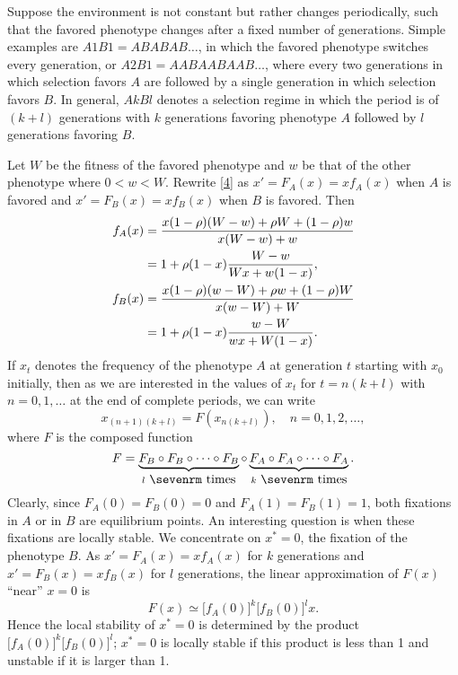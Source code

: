 \documentclass[9pt,twocolumn,twoside,lineno]{pnas-new}
\newcommand{\an}[1]{\begin{align}#1\end{align}}
\begin{document}
 Suppose the environment is not constant but rather changes periodically, such that the favored phenotype changes after a fixed number of generations. Simple examples are $A1B1=ABABAB\dots$, in which the favored phenotype switches every generation, or $A2B1=AABAABAAB\dots$, where every two generations in which selection favors $A$ are followed by a single generation in which selection favors $B$.
  In general, $AkBl$ denotes a selection regime in which the period is of $(k+l)$ generations with $k$ generations favoring phenotype $A$ followed by $l$ generations favoring $B$.
 
Let $W$ be the fitness of the favored phenotype and $w$ be that of the other phenotype where $0<w<W$. Rewrite \eqref{4} as $x'=F_A(x)=xf_A(x)$ when $A$ is favored and $x'=F_B(x)=xf_B(x)$ when $B$ is favored. Then
 \begin{equation}
 \an{
f_A(x) &= {x(1-\rho)(W-w) +\rho W +(1-\rho)w\over x(W-w) +w}\\
&= 1+\rho(1-x){W-w\over Wx +w(1-x)},\\
f_B(x) &= {x(1-\rho)(w-W) +\rho w +(1-\rho)W\over x(w-W) +W} \\
&= 1+\rho(1-x){w-W\over wx+W(1-x)}.
}\label{8}\end{equation}
  \noindent If $x_t$ denotes the frequency of  the phenotype $A$ at generation $t$ starting with $x_0$ initially, then as we are interested in the values of $x_t$ for $t=n(k+l)$ with $n=0,1,\dots$ at the end of complete periods, we can write
 \begin{equation}x_{(n+1)(k+l)}=F(x_{n(k+l)}),\quad n=0,1,2,\dots,\label{9}\end{equation}
  where $F$ is the composed function
\begin{equation}F=\underbrace{F_B\circ F_B \circ\cdots\circ F_B}_{l\ \hbox{\sevenrm times}} \circ\underbrace{F_A\circ F_A \circ\cdots\circ F_A}_{k\ \hbox{\sevenrm times}}.\label{10}\end{equation}
  Clearly, since $F_A(0) =F_B(0) =0$ and $F_A(1) =F_B(1) =1$, both fixations in $A$ or in $B$ are equilibrium points. An interesting question is when these fixations are locally stable. We concentrate on $x^*=0$, the fixation of the phenotype $B$. As $x'=F_A(x) =xf_A(x)$ for $k$ generations and $x'=F_B(x) =xf_B(x)$ for $l$ generations, the linear approximation of $F(x)$ ``near'' $x=0$ is
 \begin{equation}F(x) \simeq\bigl[f_A(0)\bigr]^k \bigl[f_B(0)\bigr]^lx.\label{11}\end{equation}
   Hence the local stability of $x^*=0$ is determined by the product $\bigl[f_A(0)\bigr]^k \bigl[f_B(0)\bigr]^l$;  $x^*=0$  is locally stable if this product  is less than 1 and unstable if it is larger than 1.
   
\end{document}
